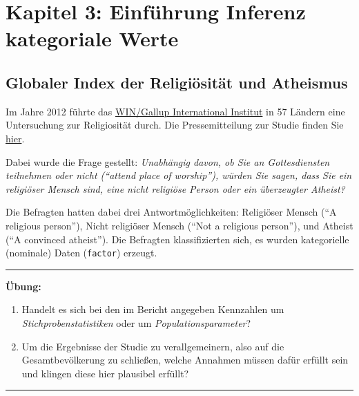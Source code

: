 \documentclass[12pt,ngerman,paper=a4,pagesize,DIV=13]{scrreprt}
\providecommand{\tightlist}{%
  \setlength{\itemsep}{0pt}\setlength{\parskip}{0pt}}
\begin{document}
\hypertarget{kapitel-3-einfuhrung-inferenz-kategoriale-werte}{%
\chapter{Kapitel 3: Einführung Inferenz kategoriale
Werte}\label{kapitel-3-einfuhrung-inferenz-kategoriale-werte}}

\hypertarget{globaler-index-der-religiositat-und-atheismus}{%
\section{Globaler Index der Religiösität und
Atheismus}\label{globaler-index-der-religiositat-und-atheismus}}

Im Jahre 2012 führte das \href{http://www.wingia.com/}{WIN/Gallup
International Institut} in 57 Ländern eine Untersuchung zur Religiosität
durch. Die Pressemitteilung zur Studie finden Sie
\href{http://www.wingia.com/web/files/richeditor/filemanager/Global_INDEX_of_Religiosity_and_Atheism_PR__6.pdf}{hier}.

Dabei wurde die Frage gestellt: \emph{Unabhängig davon, ob Sie an
Gottesdiensten teilnehmen oder nicht (\enquote{attend place of
worship}), würden Sie sagen, dass Sie ein religiöser Mensch sind, eine
nicht religiöse Person oder ein überzeugter Atheist?}

Die Befragten hatten dabei drei Antwortmöglichkeiten: Religiöser Mensch
(\enquote{A religious person}), Nicht religiöser Mensch (\enquote{Not a
religious person}), und Atheist (\enquote{A convinced atheist}). Die
Befragten klassifizierten sich, es wurden kategorielle (nominale) Daten
(\texttt{factor}) erzeugt.

\begin{center}\rule{0.5\linewidth}{\linethickness}\end{center}

\textbf{Übung:}

\begin{enumerate}
\def\labelenumi{\arabic{enumi}.}
\tightlist
\item
  Handelt es sich bei den im Bericht angegeben Kennzahlen um
  \emph{Stichprobenstatistiken} oder um \emph{Populationsparameter}?
\item
  Um die Ergebnisse der Studie zu verallgemeinern, also auf die
  Gesamtbevölkerung zu schließen, welche Annahmen müssen dafür erfüllt
  sein und klingen diese hier plausibel erfüllt?
\end{enumerate}

\begin{center}\rule{0.5\linewidth}{\linethickness}\end{center}
\end{document}
